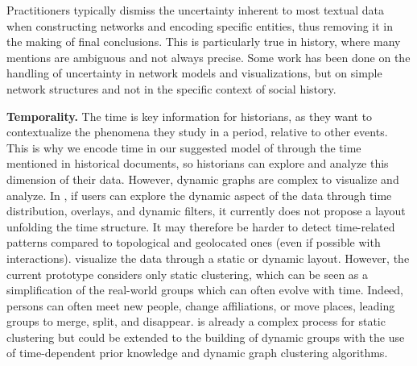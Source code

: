 Practitioners typically dismiss the uncertainty inherent to most textual data when constructing networks and encoding specific entities, thus removing it in the making of final conclusions.
This is particularly true in history, where many mentions are ambiguous and not always precise\cite{dufournaudRechercheEmpiriqueHistoire2015}.
Some work has been done on the handling of uncertainty in network models\cite{adarManagingUncertaintySocial2007} and visualizations\cite{schulzProbabilisticGraphLayout2017}, but on simple network structures and not in the specific context of social history.


\noindent\textbf{Temporality.} The time is key information for historians, as they want to contextualize the phenomena they study in a period, relative to other events.
This is why we encode time in our suggested model of \modelplural through the time mentioned in historical documents, so historians can explore and analyze this dimension of their data.
However, dynamic graphs are complex to visualize and analyze.
In \combinet, if users can explore the dynamic aspect of the data through time distribution, overlays, and dynamic filters, it currently does not propose a layout unfolding the time structure.
It may therefore be harder to detect time-related patterns compared to topological and geolocated ones (even if possible with interactions).
\pkclustering visualize the data through a static or dynamic layout.
However, the current prototype considers only static clustering, which can be seen as a simplification of the real-world groups which can often evolve with time\cite{rossettiCommunityDiscoveryDynamic2018}.
Indeed, persons can often meet new people, change affiliations, or move places, leading groups to merge, split, and disappear.
\pkclustering is already a complex process for static clustering but could be extended to the building of dynamic groups with the use of time-dependent prior knowledge and dynamic graph clustering algorithms.

